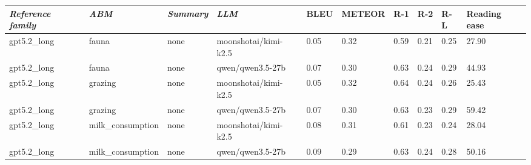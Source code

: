 \begin{tabular}{|l|l|l|l|l|l|l|l|l|l|}
\hline
\textit{\textbf{Reference family}} & \textit{\textbf{ABM}} & \textit{\textbf{Summary}} & \textit{\textbf{LLM}} & BLEU & METEOR & R-1 & R-2 & R-L & Reading ease \\
 \hline
 gpt5.2\_long & fauna & none & moonshotai/kimi-k2.5 & 0.05 & 0.32 & 0.59 & 0.21 & 0.25 & 27.90 \\
 \hline
 gpt5.2\_long & fauna & none & qwen/qwen3.5-27b & 0.07 & 0.30 & 0.63 & 0.24 & 0.29 & 44.93 \\
 \hline
 gpt5.2\_long & grazing & none & moonshotai/kimi-k2.5 & 0.05 & 0.32 & 0.64 & 0.24 & 0.26 & 25.43 \\
 \hline
 gpt5.2\_long & grazing & none & qwen/qwen3.5-27b & 0.07 & 0.30 & 0.63 & 0.23 & 0.29 & 59.42 \\
 \hline
 gpt5.2\_long & milk\_consumption & none & moonshotai/kimi-k2.5 & 0.08 & 0.31 & 0.61 & 0.23 & 0.24 & 28.04 \\
 \hline
 gpt5.2\_long & milk\_consumption & none & qwen/qwen3.5-27b & 0.09 & 0.29 & 0.63 & 0.24 & 0.28 & 50.16 \\
\hline
\end{tabular}
